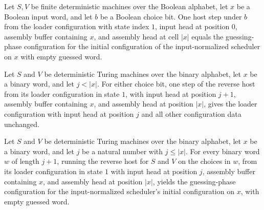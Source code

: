 \begin{lemma}
\label{Complexity.b2_rewind_done}
\leanok
{}
Let $S,V$ be finite deterministic machines over the Boolean alphabet, let $x$ be a
Boolean input word, and let $b$ be a Boolean choice bit. One host step under $b$ from
the loader configuration with state index $1$, input head at position $0$, assembly
buffer containing $x$, and assembly head at cell $|x|$ equals the guessing-phase
configuration for the initial configuration of the input-normalized scheduler on $x$
with empty guessed word.
\end{lemma}

\begin{lemma}
\label{Complexity.b2_rewind_step}
\leanok
{}
Let $S$ and $V$ be deterministic Turing machines over the binary alphabet, let $x$ be a
binary word, and let $j<|x|$. For either choice bit, one step of the reverse host from
its loader configuration in state $1$, with input head at position $j+1$, assembly
buffer containing $x$, and assembly head at position $|x|$, gives the loader
configuration with input head at position $j$ and all other configuration data
unchanged.
\end{lemma}

\begin{lemma}
\label{Complexity.b2_rewind_run}
\leanok
{}
Let $S$ and $V$ be deterministic Turing machines over the binary alphabet, let $x$ be a
binary word, and let $j$ be a natural number with $j \le |x|$. For every binary word $w$
of length $j+1$, running the reverse host for $S$ and $V$ on the choices in $w$, from
its loader configuration in state $1$ with input head at position $j$, assembly buffer
containing $x$, and assembly head at position $|x|$, yields the guessing-phase
configuration for the input-normalized scheduler's initial configuration on $x$, with
empty guessed word.
\end{lemma}

